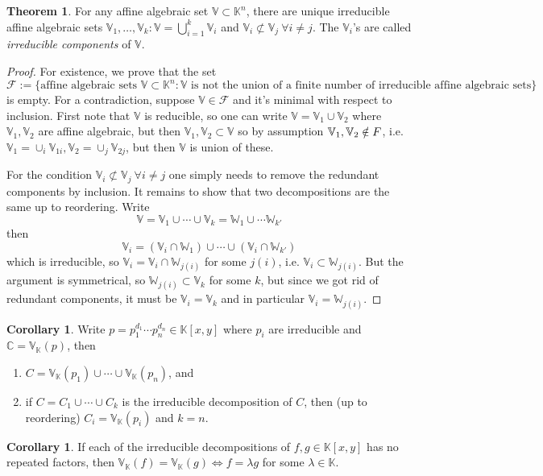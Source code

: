 \documentclass{article}
\newcommand{\F}{\mathbb{F}}
\newcommand{\C}{\mathbb{C}}
\newcommand{\K}{\mathbb{K}}
\newcommand{\V}{\mathbb{V}}
\newcommand{\W}{\mathbb{W}}
\theoremstyle{definition}
\newtheorem{thm}[defn]{Theorem}
\newtheorem{coro}[defn]{Corollary}
\begin{document}
\begin{thm}
For any affine algebraic set $\V\subset\K^n$, there are unique irreducible affine algebraic sets $\V_1,\ldots,\V_k:\V=\bigcup_{i=1}^k\V_i$ and $\V_i\not\subset\V_j \ \forall i\neq j$. The $\V_i$'s are called \textit{irreducible components} of $\V$.
\end{thm}
\begin{proof}
For existence, we prove that the set
\[
\mathcal F:=\{\text{affine algebraic sets }\V\subset\K^n:\V\text{ is not the union of a finite number of irreducible affine algebraic sets}\}
\]
is empty. For a contradiction, suppose $\V\in\mathcal F$ and it's minimal with respect to inclusion. First note that $\V$ is reducible, so one can write $\V=\V_1\cup\V_2$ where $\V_1,\V_2$ are affine algebraic, but then $\V_1,\V_2\subset\V$ so by assumption $\V_1,\V_2\notin\mathcal \F$, i.e. $\V_1=\cup_i\V_{1i},\V_2=\cup_j\V_{2j}$, but then $\V$ is union of these.

For the condition $\V_i\not\subset\V_j \ \forall i\neq j$ one simply needs to remove the redundant components by inclusion. It remains to show that two decompositions are the same up to reordering. Write
\[
\V=\V_1\cup\cdots\cup\V_k=\W_1\cup\cdots\W_{k'}
\]
then
\[
\V_i=(\V_i\cap\W_1)\cup\cdots\cup(\V_i\cap\W_{k'})
\]
which is irreducible, so $\V_i=\V_i\cap\W_{j(i)}$ for some $j(i)$, i.e. $\V_i\subset\W_{j(i)}$. But the argument is symmetrical, so $\W_{j(i)}\subset\V_k$ for some $k$, but since we got rid of redundant components, it must be $\V_i=\V_k$ and in particular $\V_i=\W_{j(i)}$.
\end{proof}

\begin{coro}
\label{coro:factorsofcurve}
Write $p=p_1^{d_1}\cdots p_n^{d_n}\in\K[x,y]$ where $p_i$ are irreducible and $\C=\V_\K(p)$, then 
\begin{enumerate}
\item $C=\V_\K(p_1)\cup\cdots\cup\V_\K(p_n)$, and
\item if $C=C_1\cup\cdots\cup C_k$ is the irreducible decomposition of $C$, then (up to reordering) $C_i=\V_\K(p_i)$ and $k=n$.
\end{enumerate}
\end{coro}

\begin{coro}
\label{coro:fgsharezerosifffislg}
If each of the irreducible decompositions of $f,g\in\K[x,y]$ has no repeated factors, then $\V_\K(f)=\V_\K(g)\iff f=\lambda g$ for some $\lambda\in\K$.
\end{coro}
\end{document}
